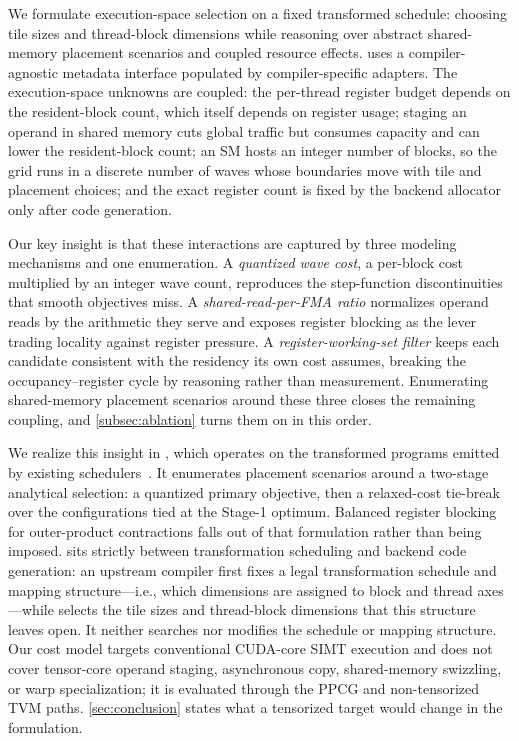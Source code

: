 We formulate execution-space selection on a fixed transformed schedule: choosing tile sizes and thread-block dimensions while reasoning over abstract shared-memory placement scenarios and coupled \gpu resource effects. \name uses a compiler-agnostic metadata interface populated by compiler-specific adapters. The execution-space unknowns are coupled: the per-thread register budget depends on the resident-block count, which itself depends on register usage; staging an operand in shared memory cuts global traffic but consumes capacity and can lower the resident-block count; an SM hosts an integer number of blocks, so the grid runs in a discrete number of waves whose boundaries move with tile and placement choices; and the exact register count is fixed by the backend allocator only after code generation.

Our key insight is that these interactions are captured by three modeling mechanisms and one enumeration. A \emph{quantized wave cost}, a per-block cost multiplied by an integer wave count, reproduces the step-function discontinuities that smooth objectives miss. A \emph{shared-read-per-FMA ratio} normalizes operand reads by the arithmetic they serve and exposes register blocking as the lever trading locality against register pressure. A \emph{register-working-set filter} keeps each candidate consistent with the residency its own cost assumes, breaking the occupancy--register cycle by reasoning rather than measurement. Enumerating shared-memory placement scenarios around these three closes the remaining coupling, and \autoref{subsec:ablation} turns them on in this order.

We realize this insight in \name, which operates on the transformed programs emitted by existing schedulers~\cite{ppcg,tvm}. It enumerates placement scenarios around a two-stage analytical selection: a quantized primary objective, then a relaxed-cost tie-break over the configurations tied at the Stage-1 optimum. Balanced register blocking for outer-product contractions falls out of that formulation rather than being imposed. \name sits strictly between transformation scheduling and backend code generation: an upstream compiler first fixes a legal transformation schedule and mapping structure---i.e., which dimensions are assigned to block and thread axes---while \name selects the tile sizes and thread-block dimensions that this structure leaves open. It neither searches nor modifies the schedule or mapping structure. Our cost model targets conventional CUDA-core SIMT execution and does not cover tensor-core operand staging, asynchronous copy, shared-memory swizzling, or warp specialization; it is evaluated through the PPCG and non-tensorized TVM paths. \autoref{sec:conclusion} states what a tensorized target would change in the formulation.

